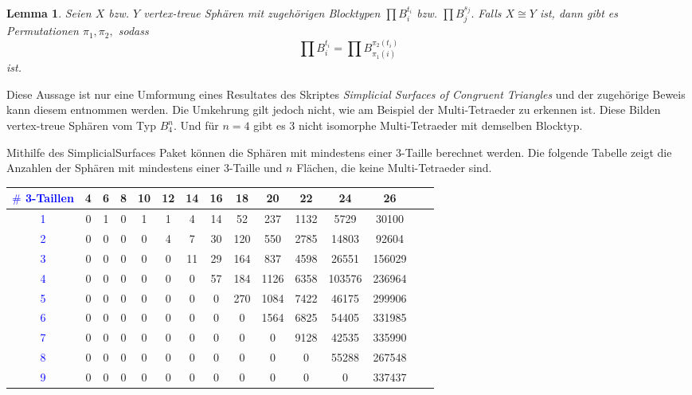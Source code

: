 \documentclass[12pt,titlepage,twoside,cleardoublepage]{article}
\theoremstyle{nummermitklammern}
\newtheorem{lemma}[temp]{Lemma}
\newtheorem{lemma}[zahl]{Lemma}
\numberwithin{equation}{section}
\begin{document}
\begin{lemma}
Seien $X$ bzw. $Y$ vertex-treue Sphären mit zugehörigen Blocktypen $\prod B_i^{t_i}$ bzw. $\prod B_j^{s_j}.$ Falls $X\cong Y$ ist, dann gibt es Permutationen $\pi_1,\pi_2,$ sodass 
\[
\prod B_i^{t_i}=\prod B_{\pi_1(i)}^{\pi_2(t_i)}
\]  
ist.
\end{lemma}
Diese Aussage ist nur eine Umformung eines Resultates des Skriptes \emph{Simplicial Surfaces of Congruent Triangles} und der zugehörige Beweis kann diesem entnommen werden. Die Umkehrung gilt jedoch nicht, wie am Beispiel der Multi-Tetraeder zu erkennen ist. Diese Bilden vertex-treue Sphären vom Typ $B_4^n.$ Und für $n=4$ gibt es 3 nicht isomorphe Multi-Tetraeder mit demselben Blocktyp.

Mithilfe des SimplicialSurfaces Paket können die Sphären mit mindestens einer 3-Taille berechnet werden. Die folgende Tabelle zeigt die Anzahlen der Sphären mit mindestens einer 3-Taille und $n$ Flächen, die keine Multi-Tetraeder sind. 
\begin{center}
\begin{tabular}{|c|c|c|c|c|c|c|c|c|c|c|c|c|c|c|}
\hline
\textcolor{blue}{$\#$ 3-Taillen }&\textbf{4}& \textbf{6}& \textbf{8}& \textbf{10}& \textbf{12}& \textbf{14}& \textbf{16}& \textbf{18}& \textbf{20}& \textbf{22}& \textbf{24}& \textbf{26}\\
\hline
\textcolor{blue}{1} &0& 1& 0& 1& 1& 4& 14& 52& 237& 1132& 5729& 30100\\
\hline
\textcolor{blue}{2} &0& 0& 0 &0& 4& 7& 30& 120& 550& 2785& 14803& 92604\\
\hline
\textcolor{blue}{3}& 0& 0& 0& 0& 0& 11& 29& 164& 837& 4598& 26551& 156029\\
\hline
\textcolor{blue}{4}& 0& 0& 0& 0& 0& 0& 57& 184& 1126& 6358& 103576& 236964\\
\hline
\textcolor{blue}{5}& 0& 0& 0& 0& 0& 0& 0& 270& 1084& 7422& 46175& 299906\\
\hline
\textcolor{blue}{6} &0& 0& 0& 0& 0& 0& 0& 0 &1564& 6825& 54405& 331985\\
\hline
\textcolor{blue}{7}& 0& 0& 0& 0& 0& 0& 0& 0& 0& 9128& 42535& 335990\\
\hline
\textcolor{blue}{8}& 0& 0& 0& 0& 0& 0& 0& 0& 0& 0& 55288& 267548\\
\hline
\textcolor{blue}{9} &0& 0& 0& 0& 0& 0& 0& 0& 0& 0& 0& 337437\\
\hline
\end{tabular}
\end{center}

\end{document}
